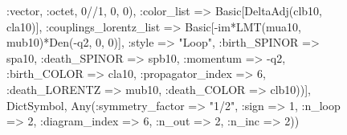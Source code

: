 \documentclass{revtex4}
\begin{document}
\begin{figure}[!htb]
\begin{center}
{:vector, :octet, 0//1, 0, 0), :color_list => Basic[DeltaAdj(clb10, cla10)], :couplings_lorentz_list => Basic[-im*LMT(mua10, mub10)*Den(-q2, 0, 0)], :style => "Loop", :birth_SPINOR => spa10, :death_SPINOR => spb10, :momentum => -q2, :birth_COLOR => cla10, :propagator_index => 6, :death_LORENTZ => mub10, :death_COLOR => clb10))], Dict{Symbol, Any}(:symmetry_factor => "1/2", :sign => 1, :n_loop => 2, :diagram_index => 6, :n_out => 2, :n_inc => 2)) 
}
\end{center}
\end{figure}
\end{document}

